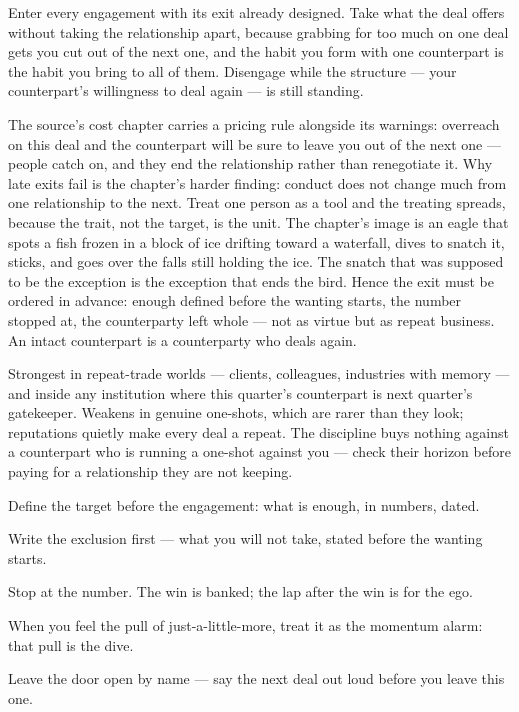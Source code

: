 \begin{core}
Enter every engagement with its exit already designed. Take what the deal offers without taking the relationship apart, because grabbing for too much on one deal gets you cut out of the next one, and the habit you form with one counterpart is the habit you bring to all of them. Disengage while the structure --- your counterpart's willingness to deal again --- is still standing.
\end{core}
\begin{mechanism}
The source's cost chapter carries a pricing rule alongside its warnings: overreach on this deal and the counterpart will be sure to leave you out of the next one --- people catch on, and they end the relationship rather than renegotiate it. Why late exits fail is the chapter's harder finding: conduct does not change much from one relationship to the next. Treat one person as a tool and the treating spreads, because the trait, not the target, is the unit. The chapter's image is an eagle that spots a fish frozen in a block of ice drifting toward a waterfall, dives to snatch it, sticks, and goes over the falls still holding the ice. The snatch that was supposed to be the exception is the exception that ends the bird. Hence the exit must be ordered in advance: enough defined before the wanting starts, the number stopped at, the counterparty left whole --- not as virtue but as repeat business. An intact counterpart is a counterparty who deals again.
\end{mechanism}
\begin{conditions}
Strongest in repeat-trade worlds --- clients, colleagues, industries with memory --- and inside any institution where this quarter's counterpart is next quarter's gatekeeper. Weakens in genuine one-shots, which are rarer than they look; reputations quietly make every deal a repeat. The discipline buys nothing against a counterpart who is running a one-shot against you --- check their horizon before paying for a relationship they are not keeping.
\end{conditions}
\begin{application}
  \item Define the target before the engagement: what is enough, in numbers, dated.
  \item Write the exclusion first --- what you will not take, stated before the wanting starts.
  \item Stop at the number. The win is banked; the lap after the win is for the ego.
  \item When you feel the pull of just-a-little-more, treat it as the momentum alarm: that pull is the dive.
  \item Leave the door open by name --- say the next deal out loud before you leave this one.
\end{application}

